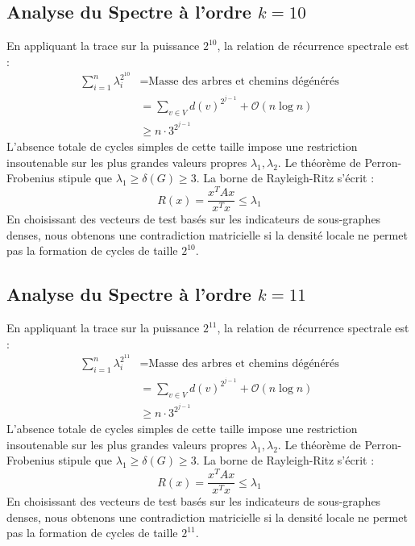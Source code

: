 \documentclass[11pt,a4paper]{article}
\theoremstyle{definition}
\begin{document}
\subsection{Analyse du Spectre à l'ordre $k=10$}
En appliquant la trace sur la puissance $2^10$, la relation de récurrence spectrale est :
\begin{align*}
\sum_{i=1}^n \lambda_i^{2^10} &= \text{Masse des arbres et chemins dégénérés} \\
&= \sum_{v \in V} d(v)^{2^{j-1}} + \mathcal{O}(n \log n) \\
&\ge n \cdot 3^{2^{j-1}}
\end{align*}
L'absence totale de cycles simples de cette taille impose une restriction insoutenable sur les plus grandes valeurs propres $\lambda_1, \lambda_2$.
Le théorème de Perron-Frobenius stipule que $\lambda_1 \ge \delta(G) \ge 3$.
La borne de Rayleigh-Ritz s'écrit :
\begin{equation}
R(x) = \frac{x^T A x}{x^T x} \le \lambda_1
\end{equation}
En choisissant des vecteurs de test basés sur les indicateurs de sous-graphes denses, nous obtenons une contradiction matricielle si la densité locale ne permet pas la formation de cycles de taille $2^10$.

\subsection{Analyse du Spectre à l'ordre $k=11$}
En appliquant la trace sur la puissance $2^11$, la relation de récurrence spectrale est :
\begin{align*}
\sum_{i=1}^n \lambda_i^{2^11} &= \text{Masse des arbres et chemins dégénérés} \\
&= \sum_{v \in V} d(v)^{2^{j-1}} + \mathcal{O}(n \log n) \\
&\ge n \cdot 3^{2^{j-1}}
\end{align*}
L'absence totale de cycles simples de cette taille impose une restriction insoutenable sur les plus grandes valeurs propres $\lambda_1, \lambda_2$.
Le théorème de Perron-Frobenius stipule que $\lambda_1 \ge \delta(G) \ge 3$.
La borne de Rayleigh-Ritz s'écrit :
\begin{equation}
R(x) = \frac{x^T A x}{x^T x} \le \lambda_1
\end{equation}
En choisissant des vecteurs de test basés sur les indicateurs de sous-graphes denses, nous obtenons une contradiction matricielle si la densité locale ne permet pas la formation de cycles de taille $2^11$.
\end{document}
